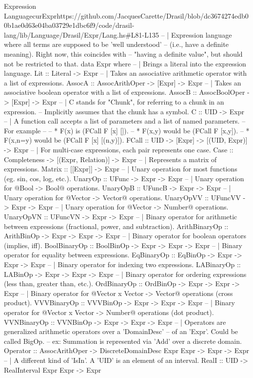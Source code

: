 \begin{haskell}{Expression Language}{curExpr}{https://github.com/JacquesCarette/Drasil/blob/dc3674274edb00b1ae0d63e04ba03729e1dbc6f9/code/drasil-lang/lib/Language/Drasil/Expr/Lang.hs\#L81-L135}
-- | Expression language where all terms are supposed to be 'well understood'
--   (i.e., have a definite meaning). Right now, this coincides with
--   "having a definite value", but should not be restricted to that.
data Expr where
  -- | Brings a literal into the expression language.
  Lit :: Literal -> Expr
  -- | Takes an associative arithmetic operator with a list of expressions.
  AssocA   :: AssocArithOper -> [Expr] -> Expr
  -- | Takes an associative boolean operator with a list of expressions.
  AssocB   :: AssocBoolOper  -> [Expr] -> Expr
  -- | C stands for "Chunk", for referring to a chunk in an expression.
  --   Implicitly assumes that the chunk has a symbol.
  C        :: UID -> Expr
  -- | A function call accepts a list of parameters and a list of named parameters.
  --   For example
  --
  --   * F(x) is (FCall F [x] []).
  --   * F(x,y) would be (FCall F [x,y]).
  --   * F(x,n=y) would be (FCall F [x] [(n,y)]).
  FCall    :: UID -> [Expr] -> [(UID, Expr)] -> Expr
  -- | For multi-case expressions, each pair represents one case.
  Case     :: Completeness -> [(Expr, Relation)] -> Expr
  -- | Represents a matrix of expressions.
  Matrix   :: [[Expr]] -> Expr
  -- | Unary operation for most functions (eg. sin, cos, log, etc.).
  UnaryOp       :: UFunc -> Expr -> Expr
  -- | Unary operation for @Bool -> Bool@ operations.
  UnaryOpB      :: UFuncB -> Expr -> Expr
  -- | Unary operation for @Vector -> Vector@ operations.
  UnaryOpVV     :: UFuncVV -> Expr -> Expr
  -- | Unary operation for @Vector -> Number@ operations.
  UnaryOpVN     :: UFuncVN -> Expr -> Expr
  -- | Binary operator for arithmetic between expressions (fractional, power, and subtraction).
  ArithBinaryOp :: ArithBinOp -> Expr -> Expr -> Expr
  -- | Binary operator for boolean operators (implies, iff).
  BoolBinaryOp  :: BoolBinOp -> Expr -> Expr -> Expr
  -- | Binary operator for equality between expressions.
  EqBinaryOp    :: EqBinOp -> Expr -> Expr -> Expr
  -- | Binary operator for indexing two expressions.
  LABinaryOp    :: LABinOp -> Expr -> Expr -> Expr
  -- | Binary operator for ordering expressions (less than, greater than, etc.).
  OrdBinaryOp   :: OrdBinOp -> Expr -> Expr -> Expr
  -- | Binary operator for @Vector x Vector -> Vector@ operations (cross product).
  VVVBinaryOp   :: VVVBinOp -> Expr -> Expr -> Expr
  -- | Binary operator for @Vector x Vector -> Number@ operations (dot product).
  VVNBinaryOp   :: VVNBinOp -> Expr -> Expr -> Expr
  -- | Operators are generalized arithmetic operators over a 'DomainDesc'
  --   of an 'Expr'.  Could be called BigOp.
  --   ex: Summation is represented via 'Add' over a discrete domain.
  Operator :: AssocArithOper -> DiscreteDomainDesc Expr Expr -> Expr -> Expr
  -- | A different kind of 'IsIn'. A 'UID' is an element of an interval.
  RealI    :: UID -> RealInterval Expr Expr -> Expr
\end{haskell}
